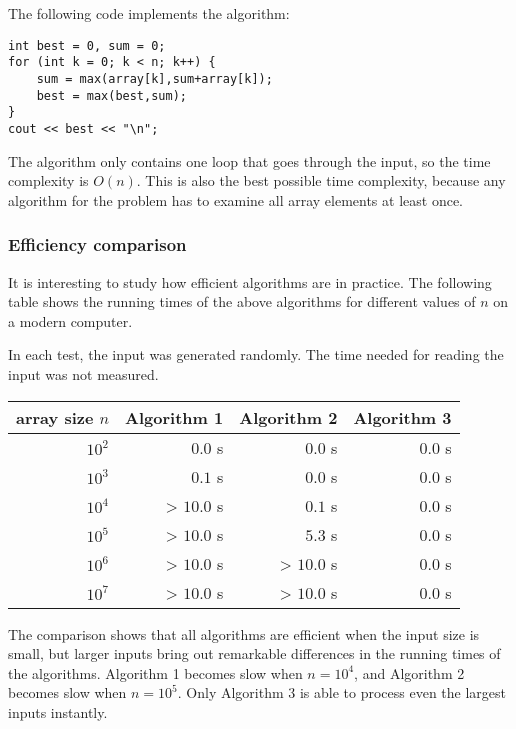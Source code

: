 The following code implements the algorithm:
\begin{lstlisting}
int best = 0, sum = 0;
for (int k = 0; k < n; k++) {
    sum = max(array[k],sum+array[k]);
    best = max(best,sum);
}
cout << best << "\n";
\end{lstlisting}

The algorithm only contains one loop
that goes through the input,
so the time complexity is $O(n)$.
This is also the best possible time complexity,
because any algorithm for the problem
has to examine all array elements at least once.

\subsubsection{Efficiency comparison}

It is interesting to study how efficient
algorithms are in practice.
The following table shows the running times
of the above algorithms for different
values of $n$ on a modern computer.

In each test, the input was generated randomly.
The time needed for reading the input was not
measured.

\begin{center}
\begin{tabular}{rrrr}
array size $n$ & Algorithm 1 & Algorithm 2 & Algorithm 3 \\
\hline
$10^2$ & $0.0$ s & $0.0$ s & $0.0$ s \\
$10^3$ & $0.1$ s & $0.0$ s & $0.0$ s \\
$10^4$ & > $10.0$ s & $0.1$ s & $0.0$ s \\
$10^5$ & > $10.0$ s & $5.3$ s & $0.0$ s \\
$10^6$ & > $10.0$ s & > $10.0$ s & $0.0$ s \\
$10^7$ & > $10.0$ s & > $10.0$ s & $0.0$ s \\
\end{tabular}
\end{center}

The comparison shows that all algorithms
are efficient when the input size is small,
but larger inputs bring out remarkable
differences in the running times of the algorithms.
Algorithm 1 becomes slow
when $n=10^4$, and Algorithm 2
becomes slow when $n=10^5$.
Only Algorithm 3 is able to process
even the largest inputs instantly.
